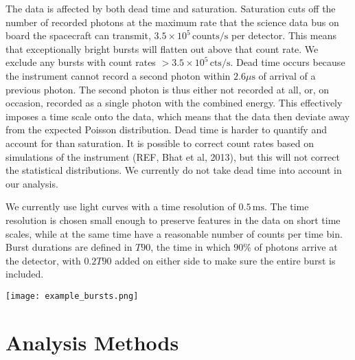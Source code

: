 \documentclass[12pt]{emulateapj}
\newcommand{\project}[1]{\textsl{#1}}
\newcommand{\RXTE}{\project{RXTE}}
\newcommand{\counts}{y}
\begin{document}
The data is affected by both dead time and saturation. Saturation cuts off the number of recorded photons at the maximum rate
that the science data bus on board the spacecraft can transmit, $3.5 \times 10^{5} \, \mathrm{counts}/\mathrm{s}$ per detector. This means
that exceptionally bright bursts will flatten out above that count rate. We exclude any bursts with count rates $>3.5\times10^{5} \, \mathrm{cts}/\mathrm{s}$.
Dead time occurs because the instrument cannot record a second photon within $2.6\mu\mathrm{s}$ of arrival of a previous photon. 
The second photon is thus either not recorded at all, or, on occasion, recorded as a single photon with the combined energy. This effectively 
imposes a time scale onto the data, which means that the data then deviate away from the expected Poisson distribution. 
Dead time is harder to quantify and account for than saturation. It is possible to correct count rates based on simulations of the instrument (REF, Bhat et al, 2013),
but this will not correct the statistical distributions. We currently do not take dead time into account in our analysis. 

We currently use light curves with a time resolution of $0.5\,\mathrm{ms}$. The time resolution is chosen small enough to preserve features
in the data on short time scales, while at the same time have a reasonable number of counts per time bin. 
Burst durations are defined in $T90$, the time in which $90\%$ of photons arrive at the detector, with $0.2T90$ added on either side
to make sure the entire burst is included. 



\begin{figure*}[h]
\begin{center}
\texttt{[image: example\_bursts.png]}
\caption{}
\label{fig:example_bursts}
\end{center}
\end{figure*}

\section{Analysis Methods}
\end{document}
